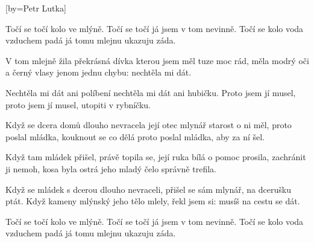 [by={Petr Lutka}]

\beginverse{}
Točí se točí kolo ve mlýně.
Točí se točí já jsem v tom nevinně.
Točí se kolo voda vzduchem padá
já tomu mlejnu ukazuju záda.
\endverse{}

\beginverse{}
\chordsoff{}
V tom mlejně žila překrásná dívka
kterou jsem měl tuze moc rád,
měla modrý oči a černý vlasy
jenom jednu chybu: nechtěla mi dát.
\chordson{}
\endverse{}

\beginverse{}
\chordsoff{}
Nechtěla mi dát ani políbení
nechtěla mi dát ani hubičku.
Proto jsem jí musel, proto jsem jí musel,
utopiti v rybníčku.
\chordson{}
\endverse{}

\beginverse{}
\chordsoff{}
Když se dcera domů dlouho nevracela
její otec mlynář starost o ni měl,
proto poslal mládka, kouknout se co dělá
proto poslal mládka, aby za ní šel.
\chordson{}
\endverse{}

\beginverse{}
\chordsoff{}
Když tam mládek přišel, právě topila se,
její ruka bílá o pomoc prosila,
zachránit ji nemoh, kosa byla ostrá
jeho mladý čelo správně trefila.
\chordson{}
\endverse{}

\beginverse{}
\chordsoff{}
Když se mládek s dcerou dlouho nevraceli,
přišel se sám mlynář, na dcerušku ptát.
Když kameny mlýnský jeho tělo mlely,
řekl jsem si: musíš na cestu se dát.
\chordson{}
\endverse{}

\beginverse{}
\chordsoff{}
Točí se točí kolo ve mlýně.
Točí se točí já jsem v tom nevinně.
Točí se kolo voda vzduchem padá
já tomu mlejnu ukazuju záda.
\chordson{}
\endverse{}

\endsong{}
